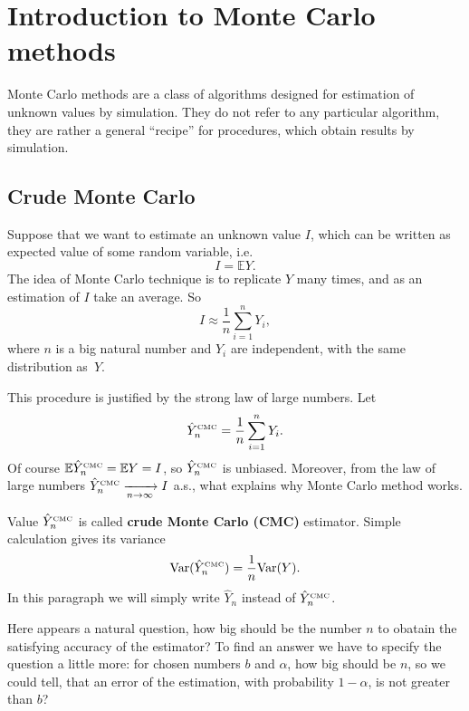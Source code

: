 \documentclass[a4paper,11pt, twoside]{book}
\theoremstyle{definition}
\theoremstyle{remark}
\def\Var{{\rm Var}}
\def\E{{\mathbb{E}}}
\def\conv{\xrightarrow[n \rightarrow \infty]{}}
\def\CMC[#1]{\hat{Y}^{\hbox{\tiny CMC}}_{#1}}
\begin{document}
\section{Introduction to Monte Carlo methods}
Monte Carlo methods are a class of algorithms designed for estimation of unknown values by simulation.
They do not refer to any particular algorithm, they are rather a general ``recipe'' for procedures, which obtain results by simulation.

\subsection{Crude Monte Carlo}
Suppose that we want to estimate an unknown value $I$, which can be written as expected value of some random variable, i.e.
\begin{equation}
 \label{eq:EY}
 I = \E Y. 
\end{equation}
The idea of Monte Carlo technique is to replicate $Y$ many times, and as an estimation of $I$ take an average. So
\[ I \approx \frac{1}{n} \sum\limits_{i=1}^n Y_i, \]
where $n$ is a big natural number and $Y_i$ are independent, with the same distribution as~$Y$.

This procedure is justified by the strong law of large numbers. Let 
\begin{equation}
 \label{eq:CMC}
 \CMC[n] = \frac{1}{n}\sum\limits_{i=1}^n Y_i.
\end{equation}
Of course $\E\CMC[n] = \E Y = I$, so $\CMC[n]$ is unbiased. Moreover, from the law of large numbers $\CMC[n] \conv I$ a.s., what explains why Monte Carlo method works. 

Value $\CMC[n]$ is called \textbf{crude Monte Carlo (CMC)} estimator. Simple calculation gives its variance
\begin{equation}
 \label{eq:VarCMC}
 \Var(\CMC[n]) = \frac{1}{n}\Var(Y).
\end{equation}
In this paragraph we will simply write $\hat{Y}_n$ instead of $\CMC[n]$.

Here appears a natural question, how big should be the number $n$ to obatain the satisfying accuracy of the estimator?
To find an answer we have to specify the question a little more: for chosen numbers $b$ and $\alpha$, how big should be $n$, so we could tell, that an error of the estimation, with probability $1-\alpha$, is not greater than $b$?
\end{document}
